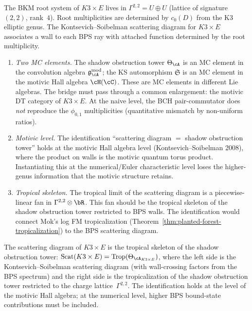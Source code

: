 
\begin{openproblem}
\label{op:programme-g-bkm-scattering}
The BKM root system of
$K3 \times E$ lives in $\Gamma^{2,2} = U \oplus U$
(lattice of signature $(2,2)$, rank~$4$).
Root multiplicities are determined by $c_0(D)$ from the K3
elliptic genus. The Kontsevich--Soibelman scattering
diagram for $K3 \times E$ associates a wall to each BPS ray
with attached function determined by the root multiplicity.
\begin{enumerate}[label=\textup{(G\arabic*)}]
\item \emph{Two MC elements.} The shadow obstruction tower
 $\Theta_{\cA}$ is an MC element in the convolution
 algebra $\mathfrak{g}_\cA^{\mathrm{mod}}$; the KS
 automorphism $\mathfrak{S}$ is an MC element in the
 motivic Hall algebra $\cH(\cC)$. These are MC elements
 in different Lie algebras. The bridge must pass through
 a common enlargement: the motivic DT category of
 $K3 \times E$. At the naive level, the BCH
 pair-commutator does \emph{not} reproduce the
 $\phi_{0,1}$ multiplicities (quantitative
 mismatch by non-uniform ratios).
\item \emph{Motivic level.} The identification
 ``scattering diagram $=$ shadow obstruction tower'' holds at
 the motivic Hall algebra level (Kontsevich--Soibelman 2008),
 where the product on walls is the motivic
 quantum torus product. Instantiating this at the
 numerical/Euler characteristic level loses the
 higher-genus information that the motivic structure
 retains.
\item \emph{Tropical skeleton.} The tropical limit of
 the scattering diagram is a piecewise-linear fan in
 $\Gamma^{2,2} \otimes \bR$. This fan should be the
 tropical skeleton of the shadow obstruction tower
 restricted to BPS walls. The identification would
 connect Mok's log FM tropicalization
 (Theorem~\ref{thm:planted-forest-tropicalization})
 to the BPS scattering diagram.
\end{enumerate}
\end{openproblem}

\begin{conjecture}
\label{conj:scattering-tropical-shadow}
\ClaimStatusConjectured\quad
The scattering diagram of $K3 \times E$ is the tropical
skeleton of the shadow obstruction tower:
$\operatorname{Scat}(K3 \times E)
= \operatorname{Trop}(\Theta_{\cA_{K3 \times E}})$,
where the left side is the Kontsevich--Soibelman
scattering diagram \textup{(}with wall-crossing factors
from the BPS spectrum\textup{)} and the right side is the
tropicalization of the shadow obstruction tower restricted
to the charge lattice~$\Gamma^{2,2}$.
The identification holds at the level of the motivic Hall
algebra; at the numerical level, higher BPS bound-state
contributions must be included.
\end{conjecture}


